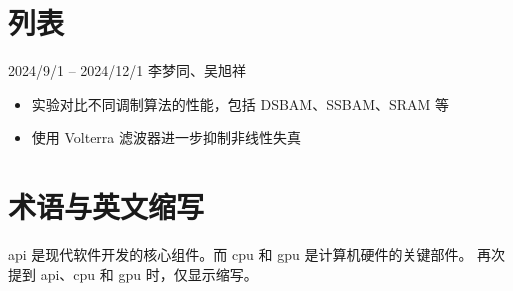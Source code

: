 \section{列表}
 \hfill {\color{njuviolet}\faCalendar*} 2024/9/1 -- 2024/12/1 \hfill {\color{njuviolet}\faUsers} 李梦同、吴旭祥
\begin{itemize}
    \item 实验对比不同调制算法的性能，包括 DSBAM、SSBAM、SRAM 等
    \item 使用 Volterra 滤波器进一步抑制非线性失真
\end{itemize}


\section{术语与英文缩写}
\gls{api} 是现代软件开发的核心组件。而 \gls{cpu} 和 \gls{gpu} 是计算机硬件的关键部件。
再次提到 \gls{api}、\gls{cpu} 和 \gls{gpu} 时，仅显示缩写。